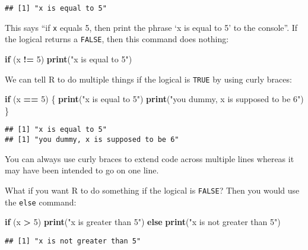 \documentclass[]{book}
\newenvironment{Shaded}{\begin{snugshade}}{\end{snugshade}}
\newcommand{\KeywordTok}[1]{\textcolor[rgb]{0.13,0.29,0.53}{\textbf{#1}}}
\newcommand{\DecValTok}[1]{\textcolor[rgb]{0.00,0.00,0.81}{#1}}
\newcommand{\StringTok}[1]{\textcolor[rgb]{0.31,0.60,0.02}{#1}}
\newcommand{\ControlFlowTok}[1]{\textcolor[rgb]{0.13,0.29,0.53}{\textbf{#1}}}
\newcommand{\OperatorTok}[1]{\textcolor[rgb]{0.81,0.36,0.00}{\textbf{#1}}}
\newcommand{\NormalTok}[1]{#1}
\theoremstyle{definition}
\theoremstyle{definition}
\theoremstyle{definition}
\theoremstyle{remark}
\begin{document}
\begin{verbatim}
## [1] "x is equal to 5"
\end{verbatim}

This says ``if \texttt{x} equals 5, then print the phrase `x is equal to
5' to the console''. If the logical returns a \texttt{FALSE}, then this
command does nothing:

\begin{Shaded}
\begin{Highlighting}[]
\ControlFlowTok{if}\NormalTok{ (x }\OperatorTok{!=}\StringTok{ }\DecValTok{5}\NormalTok{) }\KeywordTok{print}\NormalTok{(}\StringTok{"x is equal to 5"}\NormalTok{)}
\end{Highlighting}
\end{Shaded}

We can tell R to do multiple things if the logical is \texttt{TRUE} by
using curly braces:

\begin{Shaded}
\begin{Highlighting}[]
\ControlFlowTok{if}\NormalTok{ (x }\OperatorTok{==}\StringTok{ }\DecValTok{5}\NormalTok{) \{}
  \KeywordTok{print}\NormalTok{(}\StringTok{"x is equal to 5"}\NormalTok{)}
  \KeywordTok{print}\NormalTok{(}\StringTok{"you dummy, x is supposed to be 6"}\NormalTok{)}
\NormalTok{\}}
\end{Highlighting}
\end{Shaded}

\begin{verbatim}
## [1] "x is equal to 5"
## [1] "you dummy, x is supposed to be 6"
\end{verbatim}

You can always use curly braces to extend code across multiple lines
whereas it may have been intended to go on one line.

What if you want R to do something if the logical is \texttt{FALSE}?
Then you would use the \texttt{else} command:

\begin{Shaded}
\begin{Highlighting}[]
\ControlFlowTok{if}\NormalTok{ (x }\OperatorTok{>}\StringTok{ }\DecValTok{5}\NormalTok{) }\KeywordTok{print}\NormalTok{(}\StringTok{"x is greater than 5"}\NormalTok{) }\ControlFlowTok{else} \KeywordTok{print}\NormalTok{(}\StringTok{"x is not greater than 5"}\NormalTok{)}
\end{Highlighting}
\end{Shaded}

\begin{verbatim}
## [1] "x is not greater than 5"
\end{verbatim}
\end{document}
